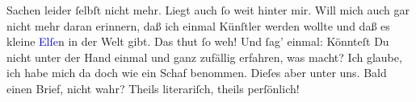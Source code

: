                   Sachen leider ſelbſt nicht mehr. Liegt auch ſo weit hinter mir. Will mich auch gar
                  nicht mehr daran erinnern, daß ich einmal Künſtler werden wollte und daß es kleine
                     \textcolor{blue}{Elſe}{}\ledrightnote{\textcolor{blue}{Else Singer}}n in der {\pb}Welt gibt. Das thut ſo weh!\pend
           \pstart
           Und ſag’ einmal: Könnteſt Du nicht unter der Hand einmal und ganz zufällig
                  erfahren, was \label{K_L02704-15v}\label{K_L02704-15h} macht? Ich glaube, ich habe mich da doch wie ein Schaf benommen. Dieſes
                  aber unter uns.\pend
           \pstart
           Bald einen Brief, nicht wahr? Theils literariſch, theils perſönlich!\pend
           \endnumbering{}  
      